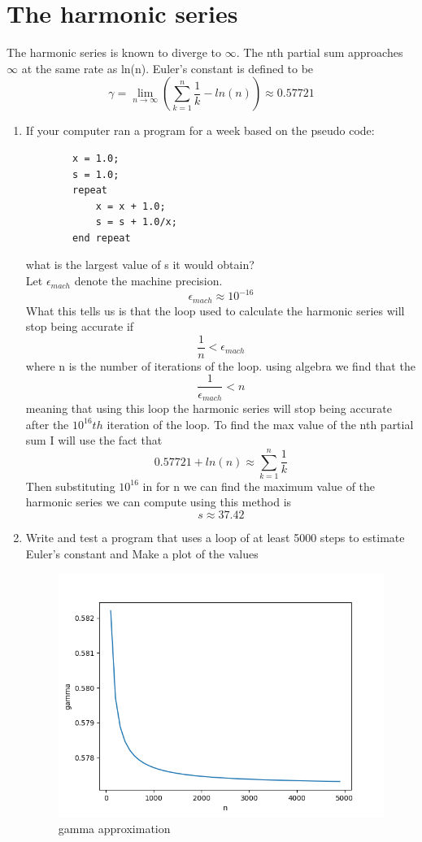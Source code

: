 \documentclass{article}
\begin{document}
\section{The harmonic series}
The harmonic series is known to diverge to $\infty$. The nth partial sum approaches $\infty$ at the same rate as ln(n). Euler’s constant is defined to be
$$\gamma = \lim_{n \to \infty } \left( \sum_{k=1}^{n}\frac{1}{k} - ln(n) \right)\approx 0.57721$$
\begin{enumerate}
	
    \item If your computer ran a program for a week based on the pseudo code:
    \begin{lstlisting}
    	x = 1.0;
    	s = 1.0;
    	repeat
    		x = x + 1.0;
    		s = s + 1.0/x;
    	end repeat
    \end{lstlisting}
   what is the largest value of s it would obtain? 
    \\Let $\epsilon_{mach} $ denote the machine precision.   $$\epsilon_{mach} \approx 10^{-16}$$ 
    What this tells us is that the loop used to calculate the harmonic series will stop being accurate if  $$ \frac{1}{n} < \epsilon_{mach}$$ where n is the number of iterations of the loop. 
    using algebra we find that the $$\frac{1}{\epsilon_{mach}} < n$$ meaning that using this loop the harmonic series will stop being accurate after the $10^{16}th$ iteration of the loop. To find the max value of the nth partial sum I will use the fact that 
    $$0.57721+ln(n)\approx \sum_{k=1}^{n}\frac{1}{k}$$
    Then substituting $10^{16}$ in for n we can find the maximum value of the harmonic series we can compute using this method is $$s \approx 37.42$$
    \item Write and test a program that uses a loop of at least 5000 steps to estimate Euler’s constant and Make a plot of the values
    \begin{figure}[hbt!]
        \centering
        \includegraphics[width=.75\linewidth]{gamma.png}
        \caption{ gamma  approximation}
        \label{fig: gamma  approximation}
    \end{figure}
    
\end{enumerate}
 
\end{document}
